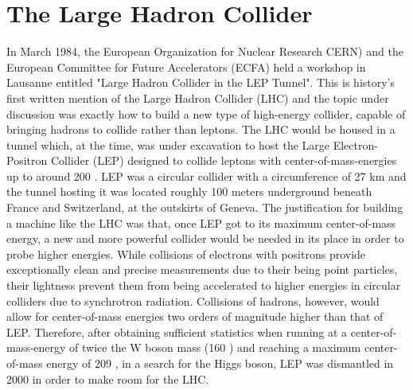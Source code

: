 \chapter{The Large Hadron Collider}
In March 1984, the European Organization for Nuclear Research CERN) and the European Committee for Future Accelerators (ECFA) 
held a workshop in Lausanne entitled "Large Hadron Collider in the LEP Tunnel". 
This is history's first written mention of the Large Hadron Collider (LHC) and the topic under discussion 
was exactly how to build a new type of high-energy collider, capable of bringing hadrons
to collide rather than leptons.
The LHC would be housed in a tunnel which, at the time, was under excavation to host the Large Electron-Positron Collider (LEP) designed to collide leptons with center-of-mass-energies up to around 200 \GeV.
LEP was a circular collider with a circumference of 27 km and the tunnel hosting it was located roughly 100 meters underground beneath France and Switzerland, at the outskirts of Geneva. 
The justification for building a machine like the LHC was that, once LEP got to its maximum center-of-mass energy, a new and more powerful collider would be needed in its place in order to probe higher energies.
While collisions of electrons with positrons provide exceptionally clean and precise measurements due to their being point particles,
 their lightness prevent them from being accelerated to higher energies in circular colliders due to synchrotron radiation. Collisions of hadrons, however, would allow for center-of-mass energies two orders of magnitude higher than that of LEP. Therefore, after obtaining sufficient statistics when running at a center-of-mass-energy of twice the W boson mass (160 \GeV) and reaching a maximum center-of-mass energy of 209 \GeV, in a search for the Higgs boson, LEP was dismantled in 2000 in order to make room for the LHC.
 

